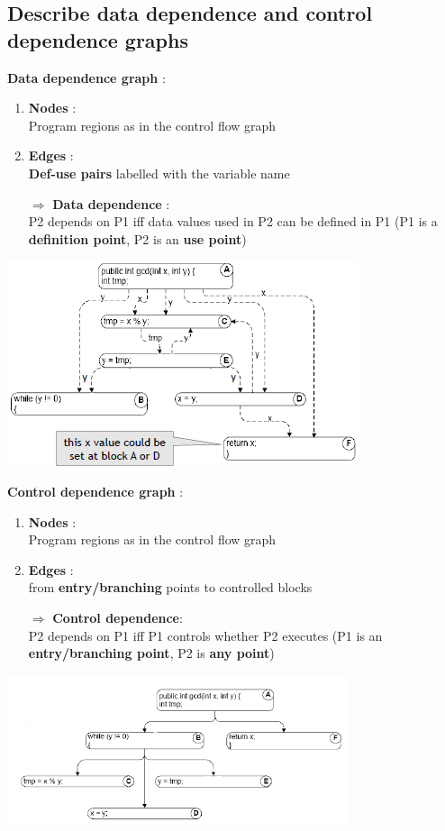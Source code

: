 \documentclass{article}
\begin{document}
\subsection{Describe data dependence and control dependence graphs}
\vspace{-0.5cm}
\begin{multicols}{2}
\noindent \textbf{Data dependence graph} :
\begin{enumerate}
    \item \textbf{Nodes} : \\Program regions as in the control flow graph
    \item \textbf{Edges} : \\\textbf{Def-use pairs} labelled with the variable name
    \item[$\Rightarrow$] \textbf{Data dependence} :\\ P2 depends on P1 iff data values used in P2 can be defined in P1 (P1 is a \textbf{definition point}, P2 is an \textbf{use point})
\end{enumerate}
\vfill\null
\begin{center}
    \includegraphics[scale = 0.7]{image/9.PNG}
\end{center}
\columnbreak
\noindent \textbf{Control dependence graph} :
\begin{enumerate}
    \item \textbf{Nodes} : \\Program regions as in the control flow graph
    \item \textbf{Edges} : \\from \textbf{entry/branching} points to controlled blocks
    \item[$\Rightarrow$] \textbf{Control dependence}: \\P2 depends on P1 iff P1 controls whether P2 executes (P1 is an \textbf{entry/branching point}, P2 is \textbf{any point})
\end{enumerate}

\vfill\null
\begin{center}
    \includegraphics[scale = 0.7]{image/10.PNG}
\end{center}
\end{multicols}
\end{document}
